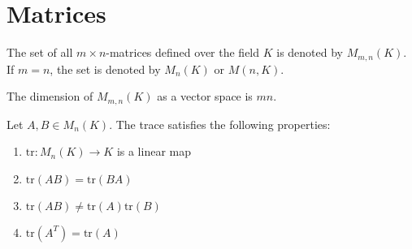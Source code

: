 \section{Matrices}

    \begin{notation}\label{linalgebra:matrix_set}
        The set of all $m\times n$-matrices defined over the field $K$ is denoted by $M_{m,n}(K)$. If $m=n$, the set is denoted by $M_n(K)$ or $M(n, K)$.
    \end{notation}

    \begin{property}[Dimension]\label{linalgebra:dimension_of_matrix_space}
        The dimension of $M_{m,n}(K)$ as a vector space is $mn$.
    \end{property}

    \begin{property}\label{linalgebra:trace_commutative}
        Let $A, B\in M_n(K)$. The trace satisfies the following properties:
        \begin{enumerate}
            \item $\text{tr}:M_n(K)\rightarrow K$ is a linear map
            \item $\text{tr}(AB) = \text{tr}(BA)$
            \item $\text{tr}(AB) \neq \text{tr}(A)\text{tr}(B)$
            \item $\text{tr}(A^T) = \text{tr}(A)$
        \end{enumerate}
    \end{property}



